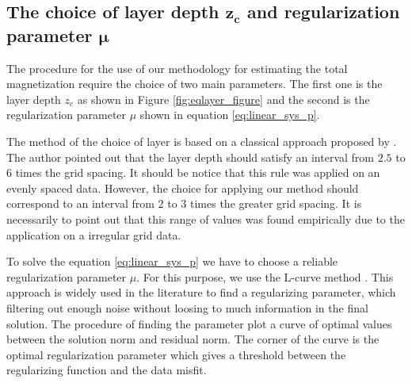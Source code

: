 \subsection{The choice of layer depth $\mathbf{z_{c}}$ and regularization parameter $\mathbf{\mu}$}

The procedure for the use of our methodology for estimating the total magnetization require the choice of two main parameters. The first one is the layer depth $z_c$ as shown in Figure \ref{fig:eqlayer_figure} and the second is the regularization parameter $\mu$ shown in equation \ref{eq:linear_sys_p}.

The method of the choice of layer is based on a classical approach proposed by \cite{dampney1969}. The author pointed out that the layer depth should satisfy an interval from $2.5$ to $6$ times the grid spacing. It should be notice that this rule was applied on an evenly spaced data. However, the choice for applying our method should correspond to an interval from $2$ to $3$ times the greater grid spacing. It is necessarily to point out that this range of values was found empirically due to the application on a irregular grid data.

To solve the equation \ref{eq:linear_sys_p} we have to choose a reliable regularization parameter $\mu$. For this purpose, we use the L-curve method \citep{hansen1992}. This approach is widely used in the literature to find a regularizing parameter, which filtering out enough noise without loosing to much information in the final solution. The procedure of finding the parameter plot a curve of optimal values between the solution norm and residual norm. The corner of the curve is the optimal regularization parameter which gives a threshold between the regularizing function and the data misfit.
